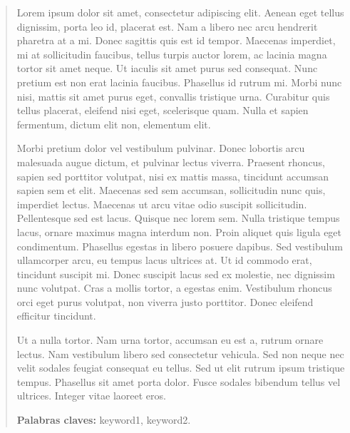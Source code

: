 \begin{quotation}
Lorem ipsum dolor sit amet, consectetur adipiscing elit. Aenean eget tellus
dignissim, porta leo id, placerat est. Nam a libero nec arcu hendrerit pharetra
at a mi. Donec sagittis quis est id tempor. Maecenas imperdiet, mi at
sollicitudin faucibus, tellus turpis auctor lorem, ac lacinia magna tortor sit
amet neque. Ut iaculis sit amet purus sed consequat. Nunc pretium est non erat
lacinia faucibus. Phasellus id rutrum mi. Morbi nunc nisi, mattis sit amet
purus eget, convallis tristique urna. Curabitur quis tellus placerat, eleifend
nisi eget, scelerisque quam. Nulla et sapien fermentum, dictum elit non,
elementum elit.

Morbi pretium dolor vel vestibulum pulvinar. Donec lobortis arcu malesuada
augue dictum, et pulvinar lectus viverra. Praesent rhoncus, sapien sed
porttitor volutpat, nisi ex mattis massa, tincidunt accumsan sapien sem et
elit. Maecenas sed sem accumsan, sollicitudin nunc quis, imperdiet lectus.
Maecenas ut arcu vitae odio suscipit sollicitudin. Pellentesque sed est lacus.
Quisque nec lorem sem. Nulla tristique tempus lacus, ornare maximus magna
interdum non. Proin aliquet quis ligula eget condimentum. Phasellus egestas in
libero posuere dapibus. Sed vestibulum ullamcorper arcu, eu tempus lacus
ultrices at. Ut id commodo erat, tincidunt suscipit mi. Donec suscipit lacus
sed ex molestie, nec dignissim nunc volutpat. Cras a mollis tortor, a egestas
enim. Vestibulum rhoncus orci eget purus volutpat, non viverra justo porttitor.
Donec eleifend efficitur tincidunt.

Ut a nulla tortor. Nam urna tortor, accumsan eu est a, rutrum ornare lectus.
Nam vestibulum libero sed consectetur vehicula. Sed non neque nec velit sodales
feugiat consequat eu tellus. Sed ut elit rutrum ipsum tristique tempus.
Phasellus sit amet porta dolor. Fusce sodales bibendum tellus vel ultrices.
Integer vitae laoreet eros.





{\bf Palabras claves:} keyword1, keyword2.

\end{quotation}

